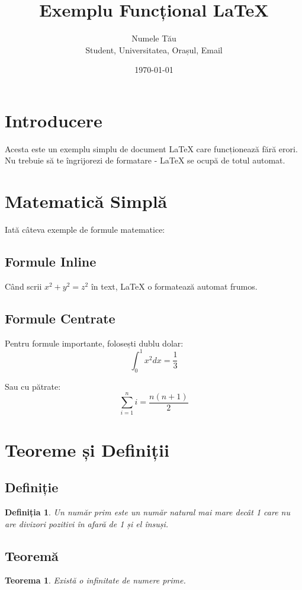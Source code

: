 \documentclass[12pt,a4paper]{article}
\newtheorem{teorema}{Teorema}
\newtheorem{definitia}{Definiția}
\begin{document}
\title{Exemplu Funcțional LaTeX}
\author{Numele Tău \\
\small{Student, Universitatea, Orașul, Email}}
\date{\today}
\maketitle

\section{Introducere}
Acesta este un exemplu simplu de document LaTeX care funcționează fără erori. Nu trebuie să te îngrijorezi de formatare - LaTeX se ocupă de totul automat.

\section{Matematică Simplă}
Iată câteva exemple de formule matematice:

\subsection{Formule Inline}
Când scrii $x^2 + y^2 = z^2$ în text, LaTeX o formatează automat frumos.

\subsection{Formule Centrate}
Pentru formule importante, folosești dublu dolar:
$$\int_{0}^{1} x^2 dx = \frac{1}{3}$$

Sau cu pătrate:
$$\sum_{i=1}^{n} i = \frac{n(n+1)}{2}$$

\section{Teoreme și Definiții}
\subsection{Definiție}
\begin{definitia}
Un număr prim este un număr natural mai mare decât 1 care nu are divizori pozitivi în afară de 1 și el însuși.
\end{definitia}

\subsection{Teoremă}
\begin{teorema}
Există o infinitate de numere prime.
\end{teorema}
\end{document}
